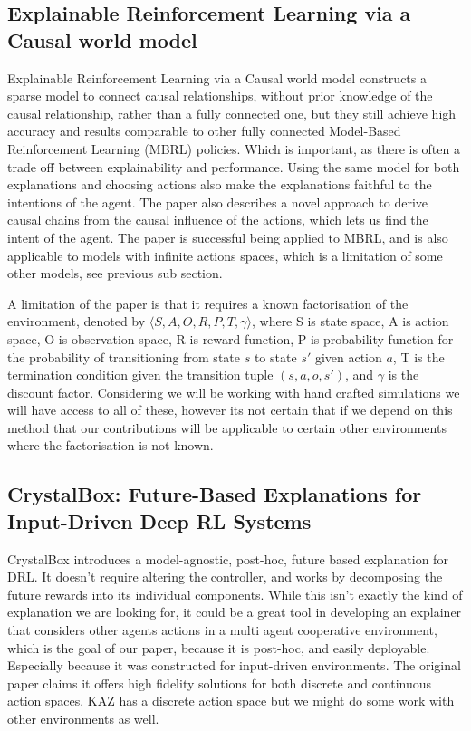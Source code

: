 \documentclass[UKenglish]{uiomasterthesis}
\begin{document}
\subsection{ Explainable Reinforcement Learning via a Causal world model}
Explainable Reinforcement Learning via a Causal world model constructs a sparse model to connect causal relationships, without prior knowledge of the causal relationship, rather than a fully connected one, but they still achieve high accuracy and results comparable to other fully connected Model-Based Reinforcement Learning (MBRL) policies. Which is important, as there is often a trade off between explainability and performance. Using the same model for both explanations and choosing actions also make the explanations faithful to the intentions of the agent. The paper also describes a novel approach to derive causal chains from the causal influence of the actions, which lets us find the intent of the agent. The paper is successful being applied to MBRL, and is also applicable to models with infinite actions spaces, which is a limitation of some other models, see previous sub section.

A limitation of the paper is that it requires a known factorisation of the environment, denoted by $\langle S, A, O, R, P, T, \gamma \rangle$, where S is state space, A is action space, O is observation space, R is reward function, P is probability function for the probability of transitioning from state $s$ to state $s'$ given action $a$, T is the termination condition given the transition tuple $(s,a,o,s')$, and $\gamma$ is the discount factor. Considering we will be working with hand crafted simulations we will have access to all of these, however its not certain that if we depend on this method that our contributions will be applicable to certain other environments where the factorisation is not known.


\subsection{ CrystalBox: Future-Based Explanations for \\Input-Driven Deep RL Systems}
CrystalBox introduces a model-agnostic, post-hoc, future based explanation for DRL. It doesn't require altering the controller, and works by decomposing the future rewards into its individual components. While this isn't exactly the kind of explanation we are looking for, it could be a great tool in developing an explainer that considers other agents actions in a multi agent cooperative environment, which is the goal of our paper, because it is post-hoc, and easily deployable. Especially because it was constructed for input-driven environments. The original paper claims it offers high fidelity solutions for both discrete and continuous action spaces. KAZ has a discrete action space but we might do some work with other environments as well.
\end{document}
